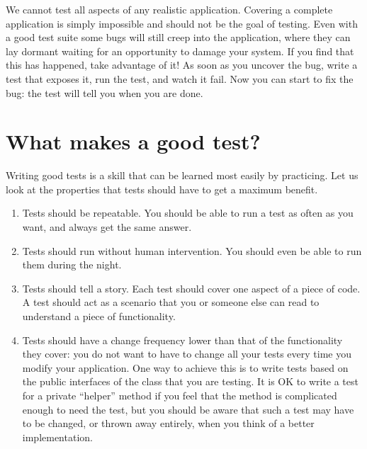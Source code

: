 \documentclass[a4paper,10pt,twoside]{book}
\begin{document}

We cannot test all aspects of any realistic application.
Covering a complete application is simply impossible and should not be the
goal of testing. 
Even with a good test suite
some bugs will still creep into the application, where they can lay dormant
waiting for an opportunity to damage your system.  
If you find that this has happened, take advantage of it!
As soon as you uncover the bug, write a test that exposes it, run the test, and watch it fail.
Now you can start to fix the bug: the test will tell you when you are done.
\section{What makes a good test?}

Writing good tests is a skill that can be learned most easily by
practicing.  Let us look at the properties that tests should have to
get a maximum benefit.

\begin{enumerate}
\item Tests should be repeatable.  You should be able to run a test
  as often as you want, and always get the same answer.

\item Tests should run without human intervention.  You should even be
  able to run them during the night.

\item Tests should tell a story.  Each test should cover one aspect of a 
  piece of code.  A test should act as a scenario that you or someone else can
  read to understand a piece of functionality. \label{prop:oneAspect}

\item Tests should have a change frequency lower than that of the
  functionality they cover:  you do not want to have to change all your
  tests every time you modify your application.  One way to achieve
  this is to write tests based on the public interfaces of the
  class that you are testing.  
  It is OK to write a test for a private ``helper'' method if you feel that the method
  is complicated enough to need the test, but you should be aware that such a test 
  may have to be changed, or thrown away entirely, when you think of a better
  implementation.
\end{enumerate}
\end{document}
